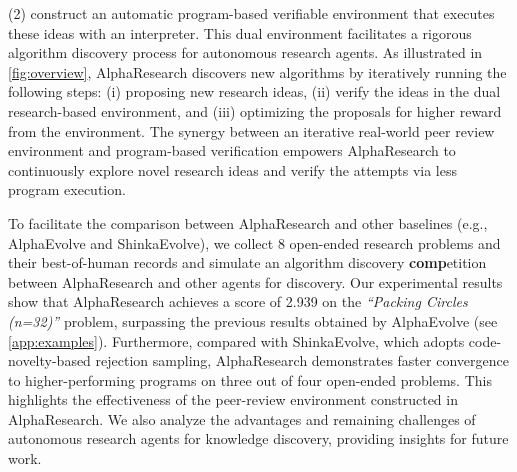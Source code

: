 (2) construct an automatic program-based verifiable environment that executes these ideas with an interpreter.
This dual environment facilitates a rigorous algorithm discovery process for autonomous research agents. As illustrated in \autoref{fig:overview}, AlphaResearch discovers new algorithms by iteratively running the following steps: (i) proposing new research ideas, (ii) verify the ideas in the dual research-based environment, and (iii) optimizing the proposals for higher reward from the environment. 
The synergy between an iterative real-world peer review environment and program-based verification empowers AlphaResearch to continuously explore novel research ideas and verify the attempts via less program execution. 

To facilitate the comparison between AlphaResearch and other baselines (e.g., AlphaEvolve and ShinkaEvolve), we collect 8 open-ended research problems and their best-of-human records \textbf{\dataset} and simulate an algorithm discovery \textbf{comp}etition between AlphaResearch and other agents for discovery.
Our experimental results show that AlphaResearch achieves a score of 2.939 on the \emph{“Packing Circles (n=32)”} problem, surpassing the previous results obtained by AlphaEvolve (see \autoref{app:examples}). 
Furthermore, compared with ShinkaEvolve, which adopts code-novelty-based rejection sampling, AlphaResearch demonstrates faster convergence to higher-performing programs on three out of four open-ended problems. This highlights the effectiveness of the peer-review environment constructed in AlphaResearch. 
We also analyze the advantages and remaining challenges of autonomous research agents for knowledge discovery, providing insights for future work.

